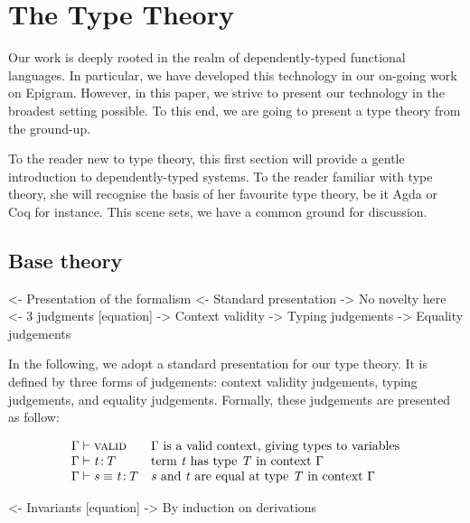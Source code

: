 \section{The Type Theory}
\label{sec:type-theory}

Our work is deeply rooted in the realm of dependently-typed functional
languages. In particular, we have developed this technology in our
on-going work on Epigram. However, in this paper,
we strive to present our technology in the broadest setting
possible. To this end, we are going to present a type theory from the
ground-up.

To the reader new to type theory, this first section will provide a
gentle introduction to dependently-typed systems. To the reader
familiar with type theory, she will recognise the basis of her
favourite type theory, be it Agda or Coq for instance. This scene sets,
we have a common ground for discussion.

\subsection{Base theory}

\begin{wstructure}
<- Presentation of the formalism
    <- Standard presentation
        -> No novelty here
    <- 3 judgments [equation]
        -> Context validity
        -> Typing judgements
        -> Equality judgements
\end{wstructure}

In the following, we adopt a standard presentation for our type
theory. It is defined by three forms of judgements: context validity
judgements, typing judgements, and equality judgements. Formally,
these judgements are presented as follow:

\[
\begin{array}{ll}
\Gamma \vdash \Valid                & \mbox{\(\Gamma\) is a valid context, giving types to variables} \\
\Gamma \vdash \Bhab{\V{t}}{\V{T}}           & \mbox{term \(\V{t}\) has type \(\V{T}\) in context \(\Gamma\)} \\
\Gamma \vdash \Bhab{\V{s} \equiv \V{t}}{\V{T}}  & \mbox{\(\V{s}\) and \(\V{t}\) are equal at type \(\V{T}\) in context \(\Gamma\)} \\
\end{array}
\]

\begin{wstructure}
    <- Invariants [equation]
        -> By induction on derivations
\end{wstructure}

